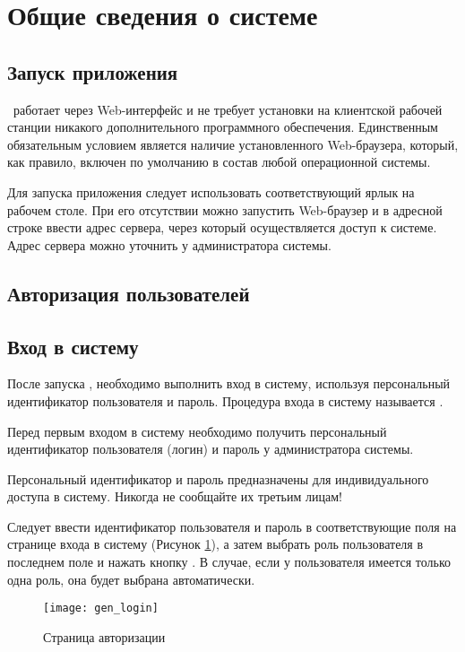 \newpage
\section{Общие сведения о системе}
\subsection{Запуск приложения}

\tmis~работает через Web-интерфейс и не требует установки на клиентской рабочей станции никакого дополнительного программного обеспечения. Единственным обязательным условием является наличие установленного Web-браузера, который, как правило, включен по умолчанию в состав любой операционной системы.

Для запуска приложения следует использовать соответствующий ярлык на рабочем столе. При его отсутствии можно запустить Web-браузер и в адресной строке ввести адрес сервера, через который осуществляется доступ к системе. Адрес сервера можно уточнить у администратора системы. 

\subsection{Авторизация пользователей}

\subsection{Вход в систему}

После запуска \tmis , необходимо выполнить вход в систему, используя персональный идентификатор пользователя и пароль. Процедура входа в систему называется . \label{auth}

Перед первым входом в систему необходимо получить персональный идентификатор пользователя (логин) и пароль у администратора системы.

\begin{vnim}
 Персональный идентификатор и пароль предназначены для индивидуального доступа в систему. Никогда не сообщайте их третьим лицам!
\end{vnim}
 
Следует ввести идентификатор пользователя и пароль в соответствующие поля на странице входа в систему (Рисунок \ref{img_gen_login}), а затем выбрать роль пользователя в последнем поле  и нажать кнопку . В случае, если у пользователя имеется только одна роль, она будет выбрана автоматически.

\begin{figure}[!ht]\centering
 \texttt{[image: gen\_login]}
 \caption{Страница авторизации}
 \label{img_gen_login}
\end{figure} 

